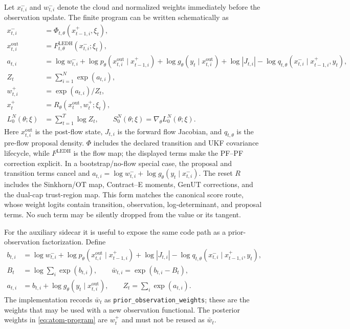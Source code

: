 \documentclass[11pt]{article}
\newcommand{\GenUT}{\ensuremath{\mathrm{GenUT}}}
\newcommand{\OT}{\ensuremath{\mathrm{OT}}}
\begin{document}
Let $x_{t,i}^{-}$ and $w_{t,i}^{-}$ denote the cloud and normalized weights
immediately before the observation update.  The finite program can be written
schematically as
\begin{align}
 x_{t,i}^{-}
   &= \Phi_{t,\theta}(x_{t-1,i}^{+},\xi_t), \\
 x_{t,i}^{\mathrm{out}}
   &= F_{t,\theta}^{\mathrm{LEDH}}(x_{t,i}^{-};\xi_t), \\
 a_{t,i}
   &= \log w_{t,i}^{-}
      +\log p_\theta(x_{t,i}^{\mathrm{out}}\mid x_{t-1,i}^{+})
      +\log g_\theta(y_t\mid x_{t,i}^{\mathrm{out}})
      +\log |J_{t,i}|
      -\log q_{t,\theta}(x_{t,i}^{-}\mid x_{t-1,i}^{+},y_t), \\
 Z_t
   &= \sum_{i=1}^{N}\exp(a_{t,i}), \\
 w_{t,i}^{+}
   &= \exp(a_{t,i})/Z_t, \\
 x_t^{+}
   &= R_\theta(x_t^{\mathrm{out}},w_t^{+};\xi_t), \label{eq:atom-program}\\
 L_0^N(\theta;\xi)
   &= \sum_{t=1}^{T}\log Z_t,\qquad
 S_0^N(\theta;\xi)=\nabla_\theta L_0^N(\theta;\xi).
\end{align}
Here $x_{t,i}^{\mathrm{out}}$ is the post-flow state, $J_{t,i}$ is the
forward flow Jacobian, and $q_{t,\theta}$ is the pre-flow proposal density.
$\Phi$ includes the declared transition and UKF covariance lifecycle, while
$F^{\mathrm{LEDH}}$ is the flow map; the displayed terms make the PF--PF
correction explicit.  In a
bootstrap/no-flow special case, the proposal and transition terms cancel and
$a_{t,i}=\log w_{t,i}^{-}+\log g_\theta(y_t\mid x_{t,i}^{-})$.  The reset $R$
includes the Sinkhorn/\OT{} map, Contract--E moments, \GenUT{} corrections,
and the dual-cap trust-region map.  This form matches the canonical score
route, whose weight logits contain transition, observation, log-determinant,
and proposal terms.  No such term may be silently dropped from the value or
its tangent.

For the auxiliary sidecar it is useful to expose the same code path as a
prior-observation factorization.  Define
\begin{align}
 b_{t,i} &= \log w_{t,i}^{-}
      +\log p_\theta(x_{t,i}^{\mathrm{out}}\mid x_{t-1,i}^{+})
      +\log |J_{t,i}|
      -\log q_{t,\theta}(x_{t,i}^{-}\mid x_{t-1,i}^{+},y_t),\\
 B_t &= \log\sum_i\exp(b_{t,i}),\qquad
 \bar w_{t,i}=\exp(b_{t,i}-B_t),\\
 a_{t,i} &= b_{t,i}+\log g_\theta(y_t\mid x_{t,i}^{\mathrm{out}}),\qquad
 Z_t=\sum_i\exp(a_{t,i}).
 \label{eq:prior-observation-factorization}
\end{align}
The implementation records $\bar w_t$ as
\texttt{prior\_observation\_weights}; these are the weights that may be
used with a new observation functional.  The posterior weights in
\eqref{eq:atom-program} are $w_t^+$ and must not be reused as $\bar w_t$.
\end{document}
